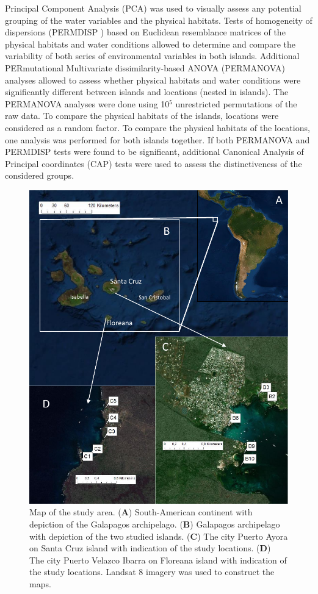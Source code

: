 \documentclass[jmse,article,accept,moreauthors,pdftex]{Definitions/mdpi}
\begin{document}
Principal Component Analysis (PCA) was used to visually assess any potential grouping of the water variables and the physical habitats. Tests of homogeneity of dispersions (PERMDISP%
) based on Euclidean resemblance matrices of the physical habitats and water conditions allowed to determine and compare the variability of both series of environmental variables in both islands. Additional PERmutational Multivariate dissimilarity-based ANOVA (PERMANOVA) analyses allowed to assess whether physical habitats and water conditions were significantly different between islands and locations (nested in islands). The PERMANOVA analyses were done using 10$^{5}$ unrestricted permutations of the raw data. To compare the physical habitats of the islands, locations were considered as a random factor. To compare the physical habitats of the locations, one analysis was performed for both islands together. If both PERMANOVA and PERMDISP tests were found to be significant, additional Canonical Analysis of Principal coordinates (CAP) tests were used to assess the distinctiveness of the considered groups. 

\begin{figure}[H]
  \includegraphics[scale=0.8]{MAP}
  \caption{Map of the study area. (\textbf{A}) South-American continent with depiction of the Galapagos archipelago. (\textbf{B}) Galapagos archipelago with depiction of the two studied islands. (\textbf{C}) The city Puerto Ayora on Santa Cruz island with indication of the study locations. (\textbf{D}) The city Puerto Velazco Ibarra on Floreana island with indication of the study locations. Landsat 8 imagery was used to construct the maps.} 
  \label{fig:MAP}
\end{figure}
\end{document}
